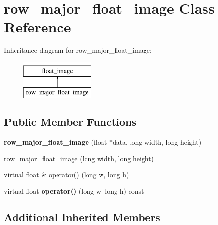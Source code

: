 \hypertarget{classrow__major__float__image}{\section{row\-\_\-major\-\_\-float\-\_\-image Class Reference}
\label{classrow__major__float__image}
}
Inheritance diagram for row\-\_\-major\-\_\-float\-\_\-image\-:\begin{figure}[H]
\begin{center}
\leavevmode
\includegraphics[height=2.000000cm]{classrow__major__float__image}
\end{center}
\end{figure}
\subsection*{Public Member Functions}
\begin{DoxyCompactItemize}
\item 
\hypertarget{classrow__major__float__image_a2aa84173f1aa9a37795e6b8d36642983}{{\bfseries row\-\_\-major\-\_\-float\-\_\-image} (float $\ast$data, long width, long height)}\label{classrow__major__float__image_a2aa84173f1aa9a37795e6b8d36642983}

\item 
\hyperlink{classrow__major__float__image_a918e2036b3d18fd6344f2edecd309891}{row\-\_\-major\-\_\-float\-\_\-image} (long width, long height)
\item 
virtual float \& \hyperlink{classrow__major__float__image_a04b9b253a3771e0963c839a9a85ccd99}{operator()} (long w, long h)
\item 
\hypertarget{classrow__major__float__image_af38e45798ef162384d75ad5c60cb40d0}{virtual float {\bfseries operator()} (long w, long h) const }\label{classrow__major__float__image_af38e45798ef162384d75ad5c60cb40d0}

\end{DoxyCompactItemize}
\subsection*{Additional Inherited Members}


